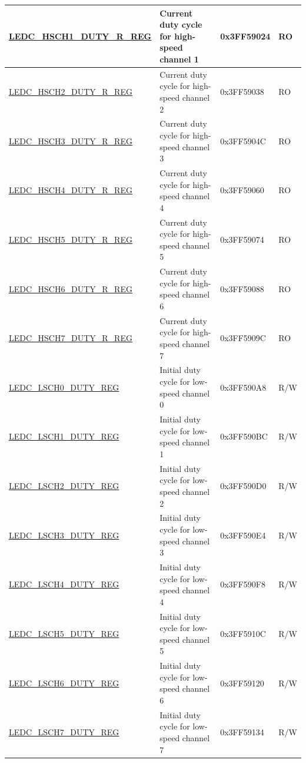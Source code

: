 \begin{longtable}{ | p{4.7cm} | p{7.3cm} | p{2cm} | p{1cm} | }
\hyperref[regdesc:LEDCHSCHnDUTYRREG]{LEDC\_HSCH1\_DUTY\_R\_REG} & Current duty cycle for high-speed channel 1 & 0x3FF59024 & RO \\ \hline
\hyperref[regdesc:LEDCHSCHnDUTYRREG]{LEDC\_HSCH2\_DUTY\_R\_REG} & Current duty cycle for high-speed channel 2 & 0x3FF59038 & RO \\ \hline
\hyperref[regdesc:LEDCHSCHnDUTYRREG]{LEDC\_HSCH3\_DUTY\_R\_REG} & Current duty cycle for high-speed channel 3 & 0x3FF5904C & RO \\ \hline
\hyperref[regdesc:LEDCHSCHnDUTYRREG]{LEDC\_HSCH4\_DUTY\_R\_REG} & Current duty cycle for high-speed channel 4 & 0x3FF59060 & RO \\ \hline
\hyperref[regdesc:LEDCHSCHnDUTYRREG]{LEDC\_HSCH5\_DUTY\_R\_REG} & Current duty cycle for high-speed channel 5 & 0x3FF59074 & RO \\ \hline
\hyperref[regdesc:LEDCHSCHnDUTYRREG]{LEDC\_HSCH6\_DUTY\_R\_REG} & Current duty cycle for high-speed channel 6 & 0x3FF59088 & RO \\ \hline
\hyperref[regdesc:LEDCHSCHnDUTYRREG]{LEDC\_HSCH7\_DUTY\_R\_REG} & Current duty cycle for high-speed channel 7 & 0x3FF5909C & RO \\ \hline
\hyperref[regdesc:LEDCLSCHnDUTYREG]{LEDC\_LSCH0\_DUTY\_REG} & Initial duty cycle for low-speed channel 0 & 0x3FF590A8 & R/W \\ \hline
\hyperref[regdesc:LEDCLSCHnDUTYREG]{LEDC\_LSCH1\_DUTY\_REG} & Initial duty cycle for low-speed channel 1 & 0x3FF590BC & R/W \\ \hline
\hyperref[regdesc:LEDCLSCHnDUTYREG]{LEDC\_LSCH2\_DUTY\_REG} & Initial duty cycle for low-speed channel 2 & 0x3FF590D0 & R/W \\ \hline
\hyperref[regdesc:LEDCLSCHnDUTYREG]{LEDC\_LSCH3\_DUTY\_REG} & Initial duty cycle for low-speed channel 3 & 0x3FF590E4 & R/W \\ \hline
\hyperref[regdesc:LEDCLSCHnDUTYREG]{LEDC\_LSCH4\_DUTY\_REG} & Initial duty cycle for low-speed channel 4 & 0x3FF590F8 & R/W \\ \hline
\hyperref[regdesc:LEDCLSCHnDUTYREG]{LEDC\_LSCH5\_DUTY\_REG} & Initial duty cycle for low-speed channel 5 & 0x3FF5910C & R/W \\ \hline
\hyperref[regdesc:LEDCLSCHnDUTYREG]{LEDC\_LSCH6\_DUTY\_REG} & Initial duty cycle for low-speed channel 6 & 0x3FF59120 & R/W \\ \hline
\hyperref[regdesc:LEDCLSCHnDUTYREG]{LEDC\_LSCH7\_DUTY\_REG} & Initial duty cycle for low-speed channel 7 & 0x3FF59134 & R/W \\ \hline

\end{longtable}
